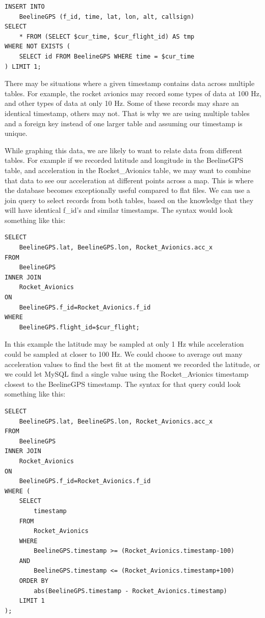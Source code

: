 \documentclass[onecolumn, draftclsnofoot, 10pt, compsoc]{IEEEtran}
\begin{document}
\begin{lstlisting}[frame=single]
INSERT INTO
	BeelineGPS (f_id, time, lat, lon, alt, callsign)
SELECT
	* FROM (SELECT $cur_time, $cur_flight_id) AS tmp
WHERE NOT EXISTS (
    SELECT id FROM BeelineGPS WHERE time = $cur_time
) LIMIT 1;
\end{lstlisting}

There may be situations where a given timestamp contains data across multiple tables.  For example, the rocket avionics may record some types of data at 100 Hz, and other types of data at only 10 Hz.  Some of these records may share an identical timestamp, others may not.  That is why we are using multiple tables and a foreign key instead of one larger table and assuming our timestamp is unique.

While graphing this data, we are likely to want to relate data from different tables.  For example if we recorded latitude and longitude in the BeelineGPS table, and acceleration in the Rocket\_Avionics table, we may want to combine that data to see our acceleration at different points across a map.  This is where the database becomes exceptionally useful compared to flat files.  We can use a join query to select records from both tables, based on the knowledge that they will have identical f\_id's and similar timestamps.  The syntax would look something like this:

\begin{lstlisting}[frame=single]
SELECT
	BeelineGPS.lat, BeelineGPS.lon, Rocket_Avionics.acc_x
FROM
	BeelineGPS
INNER JOIN
	Rocket_Avionics
ON
	BeelineGPS.f_id=Rocket_Avionics.f_id
WHERE
	BeelineGPS.flight_id=$cur_flight;
\end{lstlisting}

In this example the latitude may be sampled at only 1 Hz while acceleration could be sampled at closer to 100 Hz.  We could choose to average out many acceleration values to find the best fit at the moment we recorded the latitude, or we could let MySQL find a single value using the Rocket\_Avionics timestamp closest to the BeelineGPS timestamp.  The syntax for that query could look something like this: \cite{sql-foreign-key}

\begin{lstlisting}[frame=single]
SELECT
	BeelineGPS.lat, BeelineGPS.lon, Rocket_Avionics.acc_x
FROM
	BeelineGPS
INNER JOIN
	Rocket_Avionics
ON
	BeelineGPS.f_id=Rocket_Avionics.f_id
WHERE (
	SELECT
		timestamp
	FROM
		Rocket_Avionics
	WHERE
		BeelineGPS.timestamp >= (Rocket_Avionics.timestamp-100)
	AND
		BeelineGPS.timestamp <= (Rocket_Avionics.timestamp+100)
	ORDER BY
		abs(BeelineGPS.timestamp - Rocket_Avionics.timestamp)
	LIMIT 1
);
\end{lstlisting}
\end{document}

